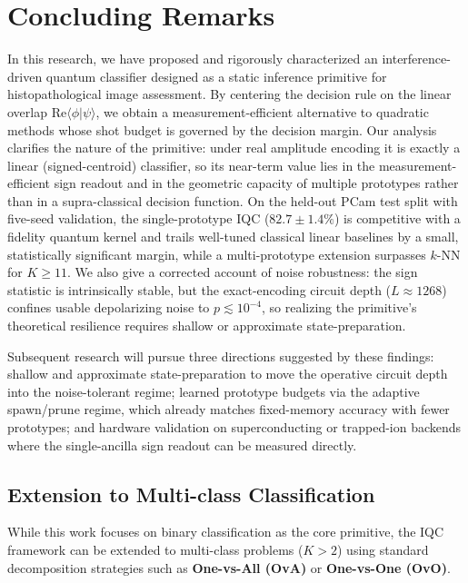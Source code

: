 \documentclass[conference]{IEEEtran}
\begin{document}
\section{Concluding Remarks}
In this research, we have proposed and rigorously characterized an interference-driven quantum classifier designed as a static inference primitive for histopathological image assessment. By centering the decision rule on the linear overlap $\mathrm{Re}\langle \phi | \psi \rangle$, we obtain a measurement-efficient alternative to quadratic methods whose shot budget is governed by the decision margin. Our analysis clarifies the nature of the primitive: under real amplitude encoding it is exactly a linear (signed-centroid) classifier, so its near-term value lies in the measurement-efficient sign readout and in the geometric capacity of multiple prototypes rather than in a supra-classical decision function. On the held-out PCam test split with five-seed validation, the single-prototype IQC ($82.7\pm1.4\%$) is competitive with a fidelity quantum kernel and trails well-tuned classical linear baselines by a small, statistically significant margin, while a multi-prototype extension surpasses $k$-NN for $K\!\geq\!11$. We also give a corrected account of noise robustness: the sign statistic is intrinsically stable, but the exact-encoding circuit depth ($L\approx1268$) confines usable depolarizing noise to $p\lesssim10^{-4}$, so realizing the primitive's theoretical resilience requires shallow or approximate state-preparation.

Subsequent research will pursue three directions suggested by these findings: shallow and approximate state-preparation to move the operative circuit depth into the noise-tolerant regime; learned prototype budgets via the adaptive spawn/prune regime, which already matches fixed-memory accuracy with fewer prototypes; and hardware validation on superconducting or trapped-ion backends where the single-ancilla sign readout can be measured directly.

\subsection{Extension to Multi-class Classification}
While this work focuses on binary classification as the core primitive, the IQC framework can be extended to multi-class problems ($K > 2$) using standard decomposition strategies such as \textbf{One-vs-All (OvA)} or \textbf{One-vs-One (OvO)}.
\end{document}
